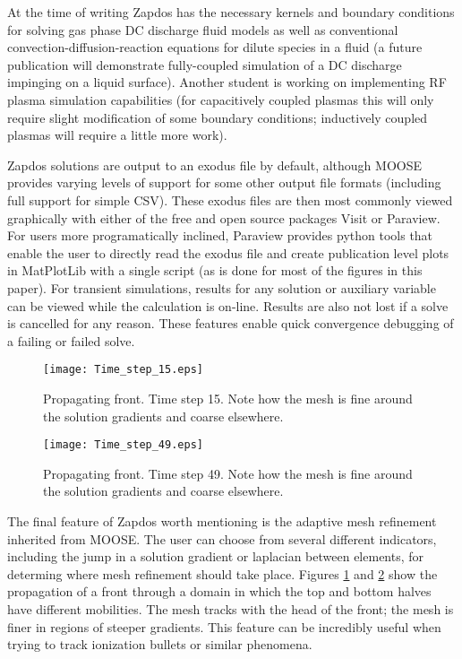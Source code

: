 At the time of writing Zapdos has the necessary kernels and boundary conditions for solving gas phase DC discharge fluid models as well as conventional convection-diffusion-reaction equations for dilute species in a fluid (a future publication will demonstrate fully-coupled simulation of a DC discharge impinging on a liquid surface). Another student is working on implementing RF plasma simulation capabilities (for capacitively coupled plasmas this will only require slight modification of some boundary conditions; inductively coupled plasmas will require a little more work).

Zapdos solutions are output to an exodus file by default, although MOOSE provides varying levels of support for some other output file formats (including full support for simple CSV). These exodus files are then most commonly viewed graphically with either of the free and open source packages Visit or Paraview. For users more programatically inclined, Paraview provides python tools that enable the user to directly read the exodus file and create publication level plots in MatPlotLib with a single script (as is done for most of the figures in this paper). For transient simulations, results for any solution or auxiliary variable can be viewed while the calculation is on-line. Results are also not lost if a solve is cancelled for any reason. These features enable quick convergence debugging of a failing or failed solve.

\begin{figure}[htbp]
  \centering
  \texttt{[image: Time\_step\_15.eps]}
  \caption{Propagating front. Time step 15. Note how the mesh is fine around the solution gradients and coarse elsewhere.}
  \label{fig:step15}
\end{figure}

\begin{figure}[htbp]
  \centering
  \texttt{[image: Time\_step\_49.eps]}
  \caption{Propagating front. Time step 49. Note how the mesh is fine around the solution gradients and coarse elsewhere.}
  \label{fig:step49}
\end{figure}

The final feature of Zapdos worth mentioning is the adaptive mesh refinement inherited from MOOSE. The user can choose from several different indicators, including the jump in a solution gradient or laplacian between elements, for determing where mesh refinement should take place. Figures \ref{fig:step15} and \ref{fig:step49} show the propagation of a front through a domain in which the top and bottom halves have different mobilities. The mesh tracks with the head of the front; the mesh is finer in regions of steeper gradients. This feature can be incredibly useful when trying to track ionization bullets or similar phenomena.
